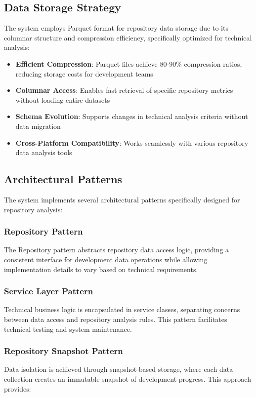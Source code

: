 \documentclass[12pt,a4paper]{article}
\begin{document}
\subsection{Data Storage Strategy}

The system employs Parquet format for repository data storage due to its columnar structure and compression efficiency, specifically optimized for technical analysis:


\begin{itemize}
\item \textbf{Efficient Compression}: Parquet files achieve 80-90\% compression ratios, reducing storage costs for development teams
\item \textbf{Columnar Access}: Enables fast retrieval of specific repository metrics without loading entire datasets
\item \textbf{Schema Evolution}: Supports changes in technical analysis criteria without data migration
\item \textbf{Cross-Platform Compatibility}: Works seamlessly with various repository data analysis tools
\end{itemize}


\subsection{Architectural Patterns}

The system implements several architectural patterns specifically designed for repository analysis:

\subsubsection{Repository Pattern}
The Repository pattern abstracts repository data access logic, providing a consistent interface for development data operations while allowing implementation details to vary based on technical requirements.

\subsubsection{Service Layer Pattern}
Technical business logic is encapsulated in service classes, separating concerns between data access and repository analysis rules. This pattern facilitates technical testing and system maintenance.

\subsubsection{Repository Snapshot Pattern}
Data isolation is achieved through snapshot-based storage, where each data collection creates an immutable snapshot of development progress. This approach provides:
\end{document}
